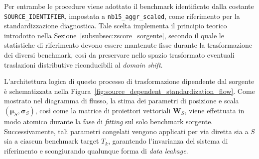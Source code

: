 Per entrambe le procedure viene adottato il benchmark identificato dalla costante \newline \texttt{SOURCE\_IDENTIFIER}, impostata a \texttt{nb15\_aggr\_scaled}, come riferimento per la standardizzazione diagnostica. 
Tale scelta implementa il principio teorico introdotto nella Sezione~\ref{subsubsec:zscore_sorgente}, secondo il quale le statistiche di riferimento devono essere mantenute fisse durante la trasformazione dei diversi benchmark, così da preservare nello spazio trasformato eventuali traslazioni distributive riconducibili al \textit{domain shift}.

L'architettura logica di questo processo di trasformazione dipendente dal sorgente è schematizzata nella Figura~\ref{fig:source_dependent_standardization_flow}. 
Come mostrato nel diagramma di flusso, la stima dei parametri di posizione e scala $(\boldsymbol{\mu}_S, \boldsymbol{\sigma}_S)$, così come la matrice di proiettori vettoriali $\mathbf{W}_S$, viene effettuata in modo atomico durante la fase di \textit{fitting} sul solo benchmark sorgente. 
Successivamente, tali parametri congelati vengono applicati per via diretta sia a $S$ sia a ciascun benchmark target $T_k$, garantendo l'invarianza del sistema di riferimento e scongiurando qualunque forma di \textit{data leakage}.

